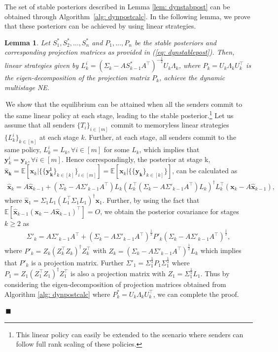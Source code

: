 \documentclass[12pt,journal,onecolumn]{IEEEtran}
\newtheorem{lemma}{Lemma}
\newenvironment{Proof}[1]{\medskip\par\noindent{\bf Proof:\,}\,#1}{{\mbox{\,$\blacksquare$}\par}}
\begin{document}
The set of stable posteriors described in Lemma \ref{lem: dynstabpost} can be obtained through Algorithm~\ref{alg: dynpostcalc}. In the following lemma, we prove that these posteriors can be achieved by using linear strategies.
\begin{lemma}\label{Lemma_11}Let $S_1^*,S_2^*,\hdots,S_n^*$ and $P_1,\hdots,P_n$ be the stable posteriors and corresponding projection matrices as provided in (\ref{eq: dynstablepost}). Then, linear strategies given by $L_k^i=(\Sigma_k-AS_{k-1}^*A^\top)^{-\frac{1}{2}}U_k\Lambda_k$, where $P_k=U_k\Lambda_kU_k^\top$ is the eigen-decomposition of the projection matrix $P_k$, achieve the dynamic multistage NE. 
\end{lemma}
\begin{Proof}
We show that the equilibrium can be attained when all the senders commit to the same linear policy at each stage, leading to the stable posterior.\footnote{This linear policy can easily be extended to the scenario where senders can follow full rank scaling of these policies.} Let us assume that all senders $\{T_i\}_{i\in[m]}$ commit to memoryless linear strategies $\{L_k^i\}_{k\in[n]}$ at each stage $k$. Further, at each stage, all senders commit to the same policy, $L_k^i=L_k,\forall i\in[m]$ for some $L_k$, which implies that $\boldsymbol{y}_k^i=\boldsymbol{y}_k,\forall i\in[m]$. Hence correspondingly, the posterior at stage k, $\boldsymbol{\hat{x}_k}=\mathbb{E}[\boldsymbol{x}_k|\{\{\boldsymbol{y_k^i}\}_{k\in[k]}\}_{i\in[m]}]=\mathbb{E}[\boldsymbol{x}_k|\{\{\boldsymbol{y_k}\}_{k\in[k]}\}]$, can be calculated as
\begin{align*}
    \hat{\boldsymbol{x}}_k=A\hat{\boldsymbol{x}}_{k-1}+(\Sigma_k-A\Sigma'_{k-1}A^\top)L_k(L_k^\top(\Sigma_k-A\Sigma'_{k-1}A^\top)L_k)^\dagger L_k^\top(\boldsymbol{x}_k-A\hat{\boldsymbol{x}}_{k-1}),
\end{align*}
where $\hat{\boldsymbol{x}}_1=\Sigma_1L_1(L_1^\top\Sigma_1L_1)^\dagger\boldsymbol{x}_1$. Further, by using the fact that $\mathbb{E}[\hat{\boldsymbol{x}}_{k-1}(\boldsymbol{x}_k-A\hat{\boldsymbol{x}}_{k-1})^\top]=O$, we obtain the posterior covariance for stages $k\geq 2$ as
\begin{align*}
    \Sigma'_{k}=A\Sigma'_{k-1}A^\top+(\Sigma_k-A\Sigma'_{k-1}A^\top)^\frac{1}{2}P'_k(\Sigma_k-A\Sigma'_{k-1}A^\top)^\frac{1}{2},
\end{align*}
where $P'_k=Z_k(Z_k^\top Z_k)^\dagger Z_k^\top$ with $Z_k=(\Sigma_k-A\Sigma'_{k-1}A^\top)^\frac{1}{2}L_k$ which implies that $P'_k$ is a projection matrix. Further $\Sigma'_1=\Sigma_1^\frac{1}{2}P_1\Sigma_1^\frac{1}{2}$ where $P_1=Z_1(Z_1^\top Z_1)^\dagger Z_1^\top$ is also a projection matrix with $Z_1=\Sigma_1^\frac{1}{2}L_1$. Thus by considering the eigen-decomposition of projection matrices obtained from Algorithm \ref{alg: dynpostcalc} where $P^*_k=U_k\Lambda_kU_k^\top$, we can complete the proof.
\end{Proof}
\end{document}
